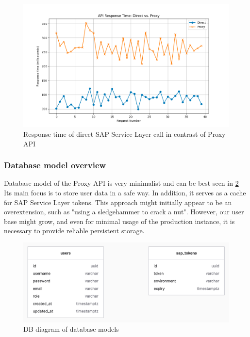 \begin{figure}[H]\centering
\includegraphics[width=140mm]{img/chap07/fig_api_response_direct_response_time_ms.png}
\caption{Response time of direct SAP Service Layer call in contrast of Proxy API}
\label{img07:response_times}
\end{figure}

\subsubsection{Database model overview}
Database model of the Proxy API is very minimalist and can be best seen in \ref{img07:db_diagram}
Its main focus is to store user data in a safe way. 
In addition, it serves as a cache for SAP Service Layer tokens. 
This approach might initially appear to be an overextension, such as "using a sledgehammer to crack a nut". 
However, our user base might grow, and even for minimal usage of the production instance, it is necessary to provide reliable persistent storage.

\begin{figure}[H]\centering
\includegraphics[width=140mm]{img/chap07/fig_db-diagram.png}
\caption{DB diagram of database models}
\label{img07:db_diagram}
\end{figure}



